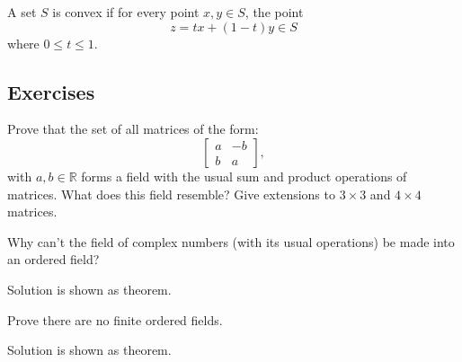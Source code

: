   \begin{definition}
    A set $S$ is convex if for every point $x, y \in S$, the point 
    \begin{equation}
      z = t x + (1 - t) y \in S
    \end{equation}
    where $0 \leq t \leq 1$. 
  \end{definition}

\subsection{Exercises} 

  \begin{exercise}
    Prove that the set of all matrices of the form:
    \begin{equation}
      \begin{bmatrix}
        a & -b \\
        b & a
      \end{bmatrix},
    \end{equation}
    with $a,b \in \mathbb{R}$ forms a field with the usual sum and product operations of
    matrices. What does this field resemble? Give extensions to $3 \times 3$ and
    $4 \times 4$ matrices.
  \end{exercise}
  \begin{solution}
    
  \end{solution}

  \begin{exercise}
    Why can't the field of complex numbers (with its usual operations) be
    made into an ordered field?
  \end{exercise}
  \begin{solution}
    Solution is shown as theorem. 
  \end{solution}

  \begin{exercise}
    Prove there are no finite ordered fields.
  \end{exercise}
  \begin{solution}
    Solution is shown as theorem. 
  \end{solution}

